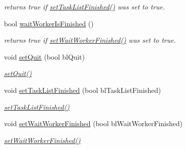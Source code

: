 \begin{DoxyCompactItemize}
\begin{DoxyCompactList}\small\item\em returns true if \hyperlink{class_wait_task_list_a5ff4ac32cdc30ec81775c02f4bd789b6}{set\+Task\+List\+Finished()} was set to true. \end{DoxyCompactList}\item 
\hypertarget{class_wait_task_list_a17ebed288354da92096e21d9411b4c7e}{}bool \hyperlink{class_wait_task_list_a17ebed288354da92096e21d9411b4c7e}{wait\+Worker\+Is\+Finished} ()\label{class_wait_task_list_a17ebed288354da92096e21d9411b4c7e}

\begin{DoxyCompactList}\small\item\em returns true if \hyperlink{class_wait_task_list_a6e5bf6d4151a3ea609db423e1b138310}{set\+Wait\+Worker\+Finished()} was set to true. \end{DoxyCompactList}\item 
\hypertarget{class_wait_task_list_a9757db554cd87cd191cc126a2d5c83cd}{}void \hyperlink{class_wait_task_list_a9757db554cd87cd191cc126a2d5c83cd}{set\+Quit} (bool bl\+Quit)\label{class_wait_task_list_a9757db554cd87cd191cc126a2d5c83cd}

\begin{DoxyCompactList}\small\item\em \hyperlink{class_wait_task_list_a9757db554cd87cd191cc126a2d5c83cd}{set\+Quit()} \end{DoxyCompactList}\item 
\hypertarget{class_wait_task_list_a5ff4ac32cdc30ec81775c02f4bd789b6}{}void \hyperlink{class_wait_task_list_a5ff4ac32cdc30ec81775c02f4bd789b6}{set\+Task\+List\+Finished} (bool bl\+Task\+List\+Finished)\label{class_wait_task_list_a5ff4ac32cdc30ec81775c02f4bd789b6}

\begin{DoxyCompactList}\small\item\em \hyperlink{class_wait_task_list_a5ff4ac32cdc30ec81775c02f4bd789b6}{set\+Task\+List\+Finished()} \end{DoxyCompactList}\item 
\hypertarget{class_wait_task_list_a6e5bf6d4151a3ea609db423e1b138310}{}void \hyperlink{class_wait_task_list_a6e5bf6d4151a3ea609db423e1b138310}{set\+Wait\+Worker\+Finished} (bool bl\+Wait\+Worker\+Finished)\label{class_wait_task_list_a6e5bf6d4151a3ea609db423e1b138310}

\begin{DoxyCompactList}\small\item\em \hyperlink{class_wait_task_list_a6e5bf6d4151a3ea609db423e1b138310}{set\+Wait\+Worker\+Finished()} \end{DoxyCompactList}\end{DoxyCompactItemize}
